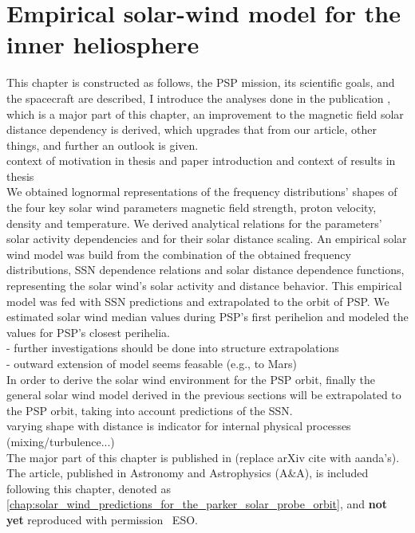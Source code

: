
\chapter{Empirical solar-wind model for the inner heliosphere}
\label{chap:empirical_solar_wind_model_for_the_inner_heliosphere}

This chapter is constructed as follows, the PSP mission, its scientific goals, and the spacecraft are described, I introduce the analyses done in the publication \citet{Venzmer2017}, which is a major part of this chapter, an improvement to the magnetic field solar distance dependency is derived, which upgrades that from our article, other things, and further an outlook is given.\\

context of motivation in thesis and paper introduction and context of results in thesis\\

We obtained lognormal representations of the frequency distributions’ shapes of the four key solar wind parameters magnetic field strength, proton velocity, density and temperature. We derived analytical relations for the parameters’ solar activity dependencies and for their solar distance scaling. An empirical solar wind model was build from the combination of the obtained frequency distributions, SSN dependence relations and solar distance dependence functions, representing the solar wind’s solar activity and distance behavior. This empirical model was fed with SSN predictions and extrapolated to the orbit of PSP. We estimated solar wind median values during PSP’s first perihelion and modeled the values for PSP’s closest perihelia.\\
- further investigations should be done into structure extrapolations\\
- outward extension of model seems feasable (e.g., to Mars)\\
In order to derive the solar wind environment for the PSP orbit, finally the general solar wind model derived in the previous sections will be extrapolated to the PSP orbit, taking into account predictions of the SSN.\\
varying shape with distance is indicator for internal physical processes (mixing/turbulence...)\\



The major part of this chapter is published in \citet{Venzmer2017} (replace arXiv cite with aanda's). The article, published in Astronomy and Astrophysics (A\&A), is included following this chapter, denoted as \autoref{chap:solar_wind_predictions_for_the_parker_solar_probe_orbit}, and \textbf{not yet} reproduced with permission \textcopyright~ESO.

